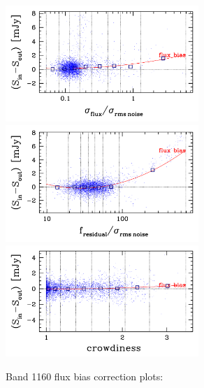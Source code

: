 \documentclass[11pt,a4paper]{article}
\begin{document}
\begin{figure}[H]
	\caption{
		Band 1160 flux bias correction plots:
	}
	\includegraphics[width=0.65\textwidth]{galsim_1160_fbias_1}
	\includegraphics[width=0.65\textwidth]{galsim_1160_fbias_2}
	\includegraphics[width=0.65\textwidth]{galsim_1160_fbias_3}
\end{figure}
\end{document}
